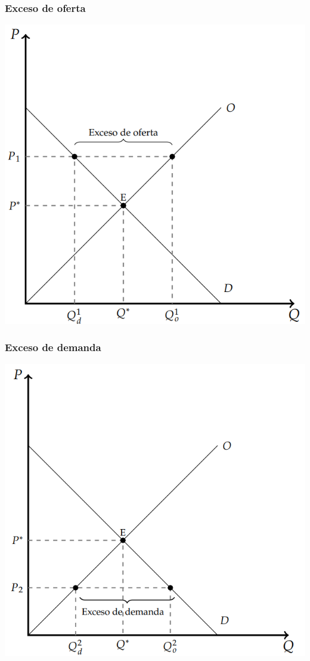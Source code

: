 \documentclass{beamer}
\begin{document}
\begin{frame}
\frametitle{Exceso de oferta}
\centering
\includegraphics[scale=0.6]{../Figures/C15.2.png}
\end{frame}

\begin{frame}
\frametitle{Exceso de demanda}
\centering
\includegraphics[scale=0.6]{../Figures/C15.3.png}
\end{frame}
\end{document}
